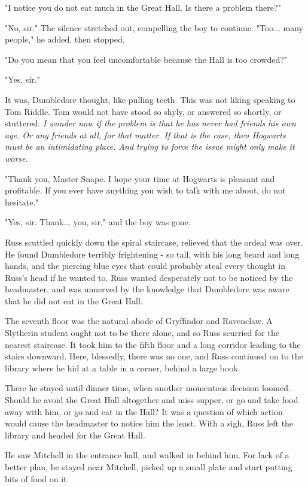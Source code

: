 \documentclass[a4paper,11pt]{article}
\begin{document}
"I notice you do not eat much in the Great Hall. Is there a problem there?"

"No, sir." The silence stretched out, compelling the boy to continue. "Too... many people," he added, then stopped.

"Do you mean that you feel uncomfortable because the Hall is too crowded?"

"Yes, sir."

It was, Dumbledore thought, like pulling teeth. This was not liking speaking to Tom Riddle. Tom would not have stood so shyly, or answered so shortly, or stuttered. \emph{I wonder now if the problem is that he has never had friends his own age. Or any friends at all, for that matter. If that is the case, then Hogwarts must be an intimidating place. And trying to force the issue might only make it worse.}

"Thank you, Master Snape. I hope your time at Hogwarts is pleasant and profitable. If you ever have anything you wish to talk with me about, do not hesitate."

"Yes, sir. Thank... you, sir," and the boy was gone.

Russ scuttled quickly down the spiral staircase, relieved that the ordeal was over. He found Dumbledore terribly frightening - so tall, with his long beard and long hands, and the piercing blue eyes that could probably steal every thought in Russ's head if he wanted to. Russ wanted desperately not to be noticed by the headmaster, and was unnerved by the knowledge that Dumbledore was aware that he did not eat in the Great Hall.

The seventh floor was the natural abode of Gryffindor and Ravenclaw. A Slytherin student ought not to be there alone, and so Russ scurried for the nearest staircase. It took him to the fifth floor and a long corridor leading to the stairs downward. Here, blessedly, there was no one, and Russ continued on to the library where he hid at a table in a corner, behind a large book.

There he stayed until dinner time, when another momentous decision loomed. Should he avoid the Great Hall altogether and miss supper, or go and take food away with him, or go and eat in the Hall? It was a question of which action would cause the headmaster to notice him the least. With a sigh, Russ left the library and headed for the Great Hall.

He saw Mitchell in the entrance hall, and walked in behind him. For lack of a better plan, he stayed near Mitchell, picked up a small plate and start putting bits of food on it.
\end{document}
